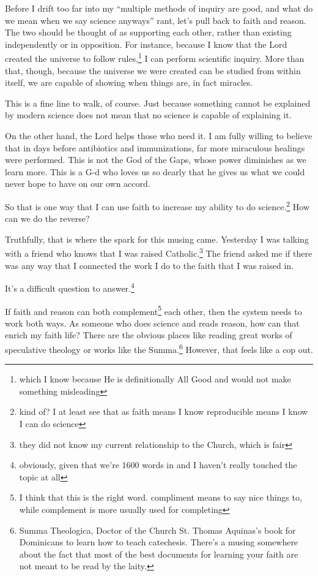 \documentclass[12pt]{article}[titlepage]
\newcommand{\say}[1]{``#1''}
\newcommand{\1}{\={a}}
\newcommand{\2}{\={e}}
\newcommand{\3}{\={\i}}
\newcommand{\4}{\=o}
\newcommand{\5}{\=u}
\newcommand{\6}{\={A}}
\renewcommand{\,}{\textsuperscript{,}}
\begin{document}
Before I drift too far into my \say{multiple methods of inquiry are good, and what do we mean when we say science anyways} rant, let's pull back to faith and reason.
The two should be thought of as supporting each other, rather than existing independently or in opposition.
For instance, because I know that the Lord created the universe to follow rules,\footnote{which I know because He is definitionally All Good and would not make something misleading} I can perform scientific inquiry.
More than that, though, because the universe we were created can be studied from within itself, we are capable of showing when things are, in fact miracles.

This is a fine line to walk, of course.
Just because something cannot be explained by modern science does not mean that no science is capable of explaining it.

On the other hand, the Lord helps those who need it.
I am fully willing to believe that in days before antibiotics and immunizations, far more miraculous healings were performed.
This is not the God of the Gaps, whose power diminishes as we learn more.
This is a G-d who loves us so dearly that he gives us what we could never hope to have on our own accord.

So that is one way that I can use faith to increase my ability to do science.\footnote{kind of? I at least see that as faith means I know reproducible means I know I can do science}
How can we do the reverse?

Truthfully, that is where the spark for this musing came.
Yesterday I was talking with a friend who knows that I was raised Catholic.\footnote{they did not know my current relationship to the Church, which is fair}
The friend asked me if there was any way that I connected the work I do to the faith that I was raised in.

It's a difficult question to answer.\footnote{obviously, given that we're 1600 words in and I haven't really touched the topic at all}

If faith and reason can both complement\footnote{I think that this is the right word. compliment means to say nice things to, while complement is more usually used for completing} each other, then the system needs to work both ways.
As someone who does science and reads reason, how can that enrich my faith life?
There are the obvious places like reading great works of speculative theology or works like the Summa.\footnote{Summa Theologica, Doctor of the Church St. Thomas Aquinas's book for Dominicans to learn how to teach catechesis. There's a musing somewhere about the fact that most of the best documents for learning your faith are not meant to be read by the laity.}
However, that feels like a cop out.
\end{document}
